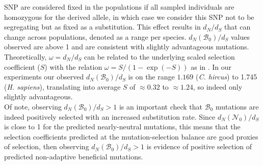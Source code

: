 \documentclass{article}
\newcommand{\dn}{d_N}
\newcommand{\ds}{d_S}
\newcommand{\SphyNeu}{\mathcal{N}_0}
\newcommand{\SphyBen}{\mathcal{B}_0}
\begin{document}
    SNP are considered fixed in the populations if all sampled individuals are homozygous for the derived allele, in which case we consider this SNP not to be segregating but as fixed as a substitution.
    This effect results in $\dn / \ds$ that can change across populations, denoted as a range per species.
    $\dn(\SphyBen) / \ds$ values observed are above 1 and are consistent with slightly advantageous mutations.\\

    Theoretically, $\omega = \dn / \ds$ can be related to the underlying scaled selection coefficient ($S$) with the relation $\omega = S /(1-\exp(-S))$ as in \cite[eq. 3]{nielsen_estimating_2003}.
    In our experiments our observed $\dn(\SphyBen) / \ds$ is on the range $1.169$ (\textit{C. hircus}) to 1.745 (\textit{H. sapiens}), translating into average $S$ of $\approx0.32$ to $\approx1.24$, so indeed only slightly advantageous.\\

    Of note, observing $\dn(\SphyBen) / \ds >1$ is an important check that $\SphyBen$ mutations are indeed positively selected with an increased substitution rate.
    Since $\dn(\SphyNeu) / \ds$ is close to 1 for the predicted nearly-neutral mutations, this means that the selection coefficients predicted at the mutation-selection balance are good proxies of selection, then observing $\dn(\SphyBen) / \ds > 1$ is evidence of positive selection of predicted non-adaptive beneficial mutations.

    \newpage
\end{document}
